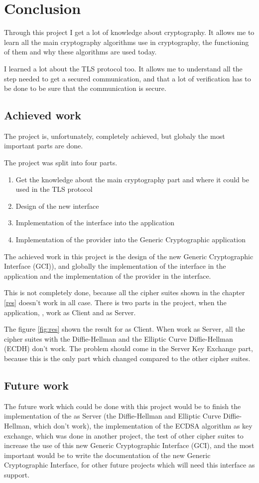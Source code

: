 \chapter{Conclusion}
Through this project I get a lot of knowledge about cryptography. It allows me
to learn all the main cryptography algorithms use in cryptography, the
functioning of them and why these algorithms are used today.

I learned a lot about the TLS protocol too. It allows me to understand all the
step needed to get a secured communication, and that a lot of verification has
to be done to be sure that the communication is secure.


\section{Achieved work}

The project is, unfortunately, completely achieved, but globaly the most
important parts are done.

The project was split into four parts.
\begin{enumerate}[noitemsep]
  \item Get the knowledge about the main cryptography part and where it could be
  used in the TLS protocol
  \item Design of the new interface
  \item Implementation of the interface into the \embtls application
  \item Implementation of the \tomcrypt provider into the Generic Cryptographic
  application
\end{enumerate}

The achieved work in this project is the design of the new Generic
Cryptographic Interface (GCI)), and globally the implementation of the interface
in the application and the implementation of the provider in the interface.

This is not completely done, because all the cipher suites shown in the
chapter \ref{res} doesn't work in all case.
There is two parts in the project, when the application, \embtls, work as Client
and as Server.

The figure \ref{fig:res} shown the result for \embtls as Client. When \embtls
work as Server, all the cipher suites with the Diffie-Hellman and the Elliptic
Curve Diffie-Hellman (ECDH) don't work. The problem should come in the Server
Key Exchange part, because this is the only part which changed compared to the
other cipher suites.

\section{Future work}
The future work which could be done with this project would be to finish the
implementation of the \embtls as Server (the Diffie-Hellman and Elliptic Curve
Diffie-Hellman, which don't work), the implementation of the ECDSA algorithm as
key exchange, which was done in another project, the test of other cipher suites
to increase the use of this new Generic Cryptographic Interface (GCI), and the
most important would be to write the documentation of the new Generic Cryptographic Interface,
for other future projects which will need this interface as support.